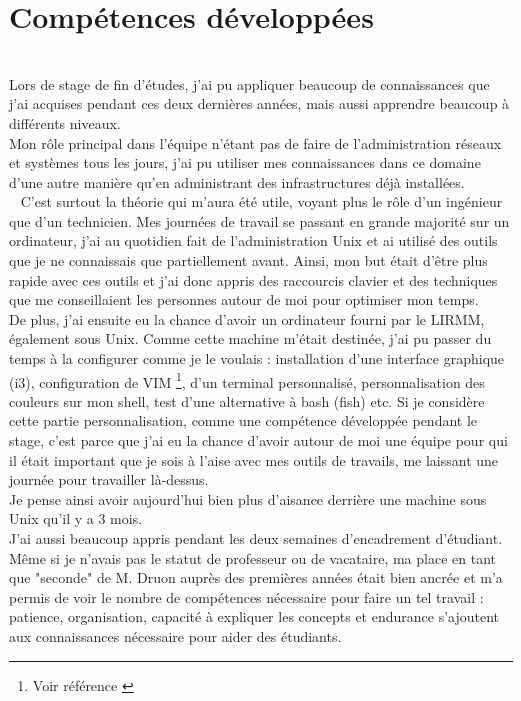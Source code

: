 \documentclass[11pt,french,a4paper]{report}
\begin{document}
    \section{Compétences développées} \\
Lors de stage de fin d'études, j'ai pu appliquer beaucoup de connaissances que j'ai acquises pendant ces deux dernières années,
mais aussi apprendre beaucoup à différents niveaux.\\
Mon rôle principal dans l'équipe n'étant pas de faire de l'administration réseaux et systèmes tous les jours, 
j'ai pu utiliser mes connaissances dans ce domaine d'une autre manière qu'en administrant des infrastructures déjà installées. \\ 
C'est surtout la théorie qui m'aura été utile, voyant plus le rôle d'un ingénieur que d'un technicien. 
Mes journées de travail se passant en grande majorité sur un ordinateur, j'ai au quotidien fait de l'administration Unix et ai
utilisé des outils que je ne connaissais que partiellement avant. Ainsi, mon but était d'être plus rapide avec ces outils 
et j'ai donc appris des raccourcis clavier et des techniques que me conseillaient les personnes autour de moi pour optimiser 
mon temps. \\
De plus, j'ai ensuite eu la chance d'avoir un ordinateur fourni par le LIRMM, également sous Unix.
Comme cette machine m'était destinée, j'ai pu passer du temps à la configurer comme je le voulais : 
installation d'une interface graphique (i3), configuration de VIM \footnote{Voir référence \cite{ref6}}, d'un terminal personnalisé, personnalisation des couleurs 
sur mon shell, test d'une alternative à bash (fish) etc. 
Si je considère cette partie personnalisation, comme une compétence développée pendant le stage, c'est parce que j'ai eu la chance 
d'avoir autour de moi une équipe pour qui il était important que je sois à l'aise avec mes outils de travails, me laissant une 
journée pour travailler là-dessus. \\
Je pense ainsi avoir aujourd'hui bien plus d'aisance derrière une machine sous Unix qu'il y a 3 mois. \\
J'ai aussi beaucoup appris pendant les deux semaines d'encadrement d'étudiant. Même si je n'avais pas le statut de professeur 
ou de vacataire, ma place en tant que "seconde" de M. Druon auprès des premières années était bien ancrée 
et m'a permis de voir le nombre de compétences nécessaire pour faire un tel travail : patience, organisation, 
capacité à expliquer les concepts et endurance s'ajoutent aux connaissances nécessaire pour aider des étudiants. 
\end{document}
